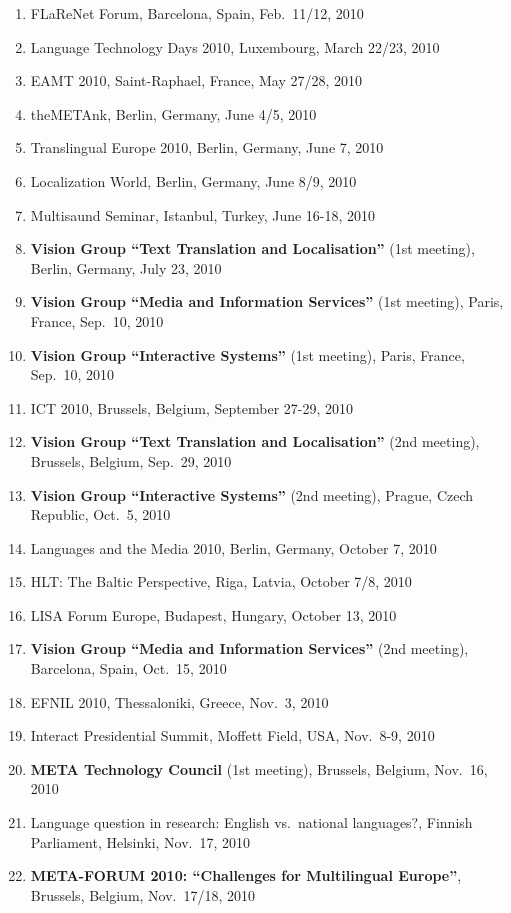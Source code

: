 \documentclass[10pt, plain]{../../metanetpaper}
\begin{document}
\begin{small}
\begin{enumerate}
\item FLaReNet Forum, Barcelona, Spain, Feb.~11/12, 2010
\item Language Technology Days 2010, Luxembourg, March 22/23, 2010
\item EAMT 2010, Saint-Raphael, France, May 27/28, 2010
\item theMETAnk, Berlin, Germany, June 4/5, 2010
\item Translingual Europe 2010, Berlin, Germany, June 7, 2010
\item Localization World, Berlin, Germany, June 8/9, 2010
\item Multisaund Seminar, Istanbul, Turkey, June 16-18, 2010
\item \textbf{Vision Group ``Text Translation and Localisation''} (1st meeting), Berlin, Germany, July 23, 2010
\item \textbf{Vision Group ``Media and Information Services''} (1st meeting), Paris, France, Sep.~10, 2010
\item \textbf{Vision Group ``Interactive Systems''} (1st meeting), Paris, France, Sep.~10, 2010
\item ICT 2010, Brussels, Belgium, September 27-29, 2010
\item \textbf{Vision Group ``Text Translation and Localisation''} (2nd meeting), Brussels, Belgium, Sep.~29, 2010
\item \textbf{Vision Group ``Interactive Systems''} (2nd meeting), Prague, Czech Republic, Oct.~5, 2010
\item Languages and the Media 2010, Berlin, Germany, October 7, 2010
\item HLT: The Baltic Perspective, Riga, Latvia, October 7/8, 2010
\item LISA Forum Europe, Budapest, Hungary, October 13, 2010
\item \textbf{Vision Group ``Media and Information Services''} (2nd meeting), Barcelona, Spain, Oct.~15, 2010
\item EFNIL 2010, Thessaloniki, Greece, Nov.~3, 2010
\item Interact Presidential Summit, Moffett Field, USA, Nov.~8-9, 2010
\item \textbf{META Technology Council} (1st meeting), Brussels, Belgium, Nov.~16, 2010
\item Language question in research: English vs.~national languages?, Finnish Parliament, Helsinki, Nov.~17, 2010
\item \textbf{META-FORUM 2010: ``Challenges for Multilingual Europe''}, Brussels, Belgium, Nov.~17/18, 2010

\end{enumerate}
\end{small}
\end{document}
